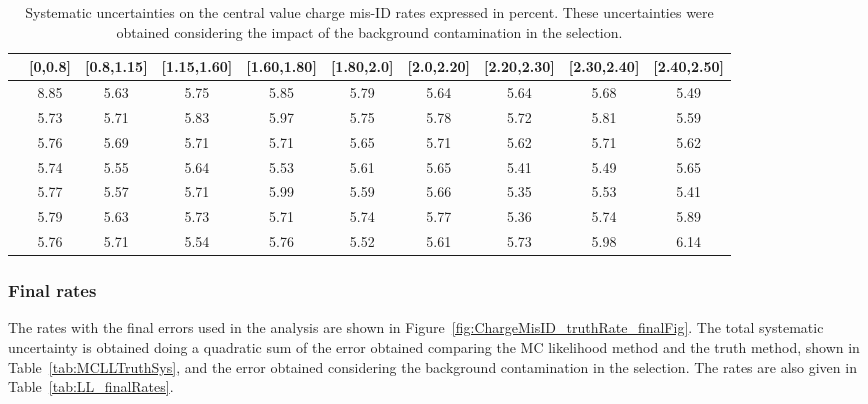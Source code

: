 \begin{table}
\footnotesize
\centering
\begin{tabular}{c|c|c|c|c|c|c|c|c|c}
  \hline
  \backslashbox{\pt[\GeV]}{$|$\eta$|$} &[0,0.8] &[0.8,1.15] &[1.15,1.60] &[1.60,1.80] &[1.80,2.0] &[2.0,2.20] &[2.20,2.30] &[2.30,2.40] &[2.40,2.50] \\ 
  \hline
  [15,30] &8.85 &5.63 &5.75 &5.85 &5.79 &5.64 &5.64 &5.68 &5.49 \\
  \hline
  [30,40] &5.73 &5.71 &5.83 &5.97 &5.75 &5.78 &5.72 &5.81 &5.59 \\
  \hline
  [40,50] &5.76 &5.69 &5.71 &5.71 &5.65 &5.71 &5.62 &5.71 &5.62 \\
  \hline
  [50,60] &5.74 &5.55 &5.64 &5.53 &5.61 &5.65 &5.41 &5.49 &5.65 \\
  \hline
  [60,80] &5.77 &5.57 &5.71 &5.99 &5.59 &5.66 &5.35 &5.53 &5.41 \\
  \hline
  [80,120] &5.79 &5.63 &5.73 &5.71 &5.74 &5.77 &5.36 &5.74 &5.89 \\
  \hline
  [120,1000] &5.76 &5.71 &5.54 &5.76 &5.52 &5.61 &5.73 &5.98 &6.14  \\
  \hline
\end{tabular}
\caption{Systematic uncertainties on the central value charge mis-ID rates expressed in percent. These uncertainties were obtained considering the impact of the background contamination in the selection.}
\label{tab:Charge_MisID_Bkg_Sys}
\end{table} 
 


\subsubsection{Final rates}

The rates with the final errors used in the analysis are shown in Figure~\ref{fig:ChargeMisID_truthRate_finalFig}. The total systematic uncertainty is obtained doing a quadratic sum of the error obtained comparing the MC likelihood method and the truth method, shown in Table~\ref{tab:MCLLTruthSys}, and the error obtained considering the background contamination in the selection. The rates are also given in Table~\ref{tab:LL_finalRates}.

